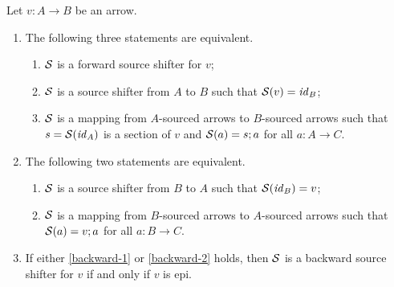 \begin{proposition}
Let $v:A\to B$ be an arrow.
\begin{enumerate}
\item The following three statements are equivalent.
\begin{enumerate}[label=(\alph*),ref=\theenumi(\theenumii)]
\item\label{forward-1} $\mathcal{S}$ is a forward source shifter for $v$;
\item\label{forward-2} $\mathcal{S}$ is a source shifter from $A$ to $B$ such that $\mathcal{S}(v)=\mathit{id}_B$;
\item\label{forward-3} $\mathcal{S}$ is a mapping from $A$-sourced arrows to $B$-sourced arrows such that $s=\mathcal{S}(\mathit{id}_A)$ is a section of $v$ and $\mathcal{S}(a)=s;a$ for all $a:A\to C$.
\end{enumerate}
\item The following two statements are equivalent.
\begin{enumerate}[label=(\alph*),ref=\theenumi(\theenumii)]
\item\label{backward-1} $\mathcal{S}$ is a source shifter from $B$ to $A$ such that $\mathcal{S}(\mathit{id}_B)=v$;
\item\label{backward-2} $\mathcal{S}$ is a mapping from $B$-sourced arrows to $A$-sourced arrows such that $\mathcal{S}(a)=v;a$ for all $a:B\to C$.
\end{enumerate}
\item If either \ref{backward-1} or \ref{backward-2} holds, then $\mathcal{S}$ is a backward source shifter for $v$ if and only if $v$ is epi.
\end{enumerate}
\end{proposition}
%

